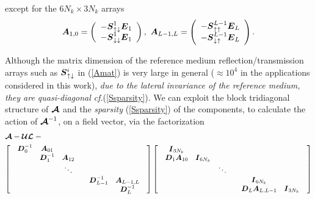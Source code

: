 except for the $6 N_k\times 3 N_k$ arrays
\begin{equation}	\label{A10def}
	{\mbox{\boldmath$\mit A$\unboldmath}}_{ 1, 0}=\left({\begin{array}{c} -{\mbox{\boldmath$\mit S$\unboldmath}}^{1}_{\uparrow 
\downarrow } {\mbox{\boldmath$\mit E$\unboldmath}}_{1}\\ 
	-{\mbox{\boldmath$\mit S$\unboldmath}}^{1}_{\downarrow\downarrow } {\mbox{\boldmath$\mit E$\unboldmath}}_{1}\end{array}}\right), \
{\mbox{\boldmath$\mit A$\unboldmath}}_{L-1, L}= \left({\begin{array}{c} -{\mbox{\boldmath$\mit S$\unboldmath}}^{L-1}_{\uparrow 
\uparrow} {\mbox{\boldmath$\mit E$\unboldmath}}_{L}\\ -{\mbox{\boldmath$\mit S$\unboldmath}}^{L-1}_{\downarrow\uparrow } {\mbox{\boldmath$\mit E$\unboldmath}}_{L}
\end{array}}\right).
\end{equation}

Although the matrix dimension of the reference 
medium reflection/transmission arrays such as 
${\mbox{\boldmath$\mit S$\unboldmath}}{}_{\uparrow\downarrow }^{i}$ in (\ref{Amat})  is very large in general 
($\approx 10^{4}$ in the applications considered in this work), 
{\em due to the lateral invariance of the reference medium, they are quasi-diagonal\/} {\em 
cf.\/}(\ref{Ssparsity}).
We can exploit the block tridiagonal structure of ${\mbox{\boldmath$\cal A$\unboldmath}}$ and the {\em 
sparsity\/} (\ref{Ssparsity}) of the components, to calculate 
the action of ${\mbox{\boldmath$\cal A$\unboldmath}}^{-1}$,
on a field vector, via the factorization 
\begin{eqnarray}
\lefteqn{{\CB  A} ={\CB  U}{\CB  L}=}\nonumber\\
&&\!\!\!\!\!\!
\left[{\begin{array}{cc}\begin{array}{ccc}{\bmi  D}^{-1}_{0}&{\bmi 
A}_{01}&\\ &{\bmi  D}^{-1}_{1}&{\bmi  A}_{12}\\&&\ddots\end{array}&\\
&\begin{array}{cc}{\bmi  D}^{-1}_{L-1}&{\bmi  A}_{ L-1,L}\\ &{\bmi  D}^{-1}_{L}
\end{array}\end{array}}\right]
\left[{\begin{array}{cc}
\begin{array}{ccc}{\bmi  I}_{3 N_k}&&\\{\bmi 
D}_{1}{\bmi  A}_{10} &{\bmi  I}_{6 N_k}&\\&&\ddots\end{array}&\\ 
&\begin{array}{cc}
{\bmi  I}_{6 N_k}&\\ {\bmi  D}_{L}{\bmi  A}_{L,L-1}&{\bmi 
I}_{3 N_k}\end{array}\end{array}}\right]
\end{eqnarray}
